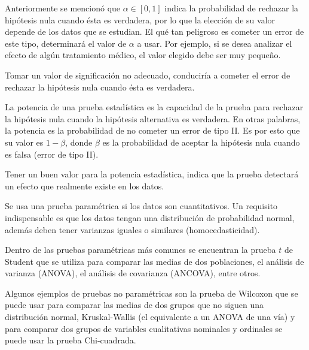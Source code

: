 \documentclass[12pt]{article}
\begin{document}
 	
 	Anteriormente se mencionó que $\alpha \in [0, 1]$ indica la probabilidad de rechazar la hipótesis nula cuando ésta es verdadera, por lo que la elección de su valor depende de los datos que se estudian. El qué tan peligroso es cometer un error de este tipo, determinará el valor de $\alpha$ a usar. Por ejemplo, si se desea analizar el efecto de algún tratamiento médico, el valor elegido debe ser muy pequeño. 
 	
	
	Tomar un valor de significación no adecuado, conduciría a cometer el error de rechazar la hipótesis nula cuando ésta es verdadera.
	 
	
	La potencia de una prueba estadística es la capacidad de la prueba para rechazar la hipótesis nula cuando la hipótesis alternativa es verdadera. En otras palabras, la potencia es la probabilidad de no cometer un error de tipo II. Es por esto que su valor es $1-\beta$, donde $\beta$ es la probabilidad de aceptar la hipótesis nula cuando es falsa (error de tipo II).
	
	Tener un buen valor para la potencia estadística, indica que la prueba detectará un efecto que realmente existe en los datos. 
	
	
	Se usa una prueba paramétrica si los datos son cuantitativos. Un requisito indispensable es que los datos tengan una distribución de probabilidad normal, además deben tener varianzas iguales o similares (homocedasticidad).
	
	
	Dentro de las pruebas paramétricas más comunes se encuentran la prueba $t$ de Student que se utiliza para comparar las medias de dos poblaciones, el análisis de varianza (ANOVA), el análisis de covarianza (ANCOVA), entre otros.
	
	Algunos ejemplos de pruebas no paramétricas son la prueba de Wilcoxon que se puede usar para comparar las medias de dos grupos que no siguen una distribución normal, Kruskal-Wallis (el equivalente a un ANOVA de una vía) y para comparar dos grupos de variables cualitativas nominales y ordinales se puede usar la prueba Chi-cuadrada.  
	
\end{document}
